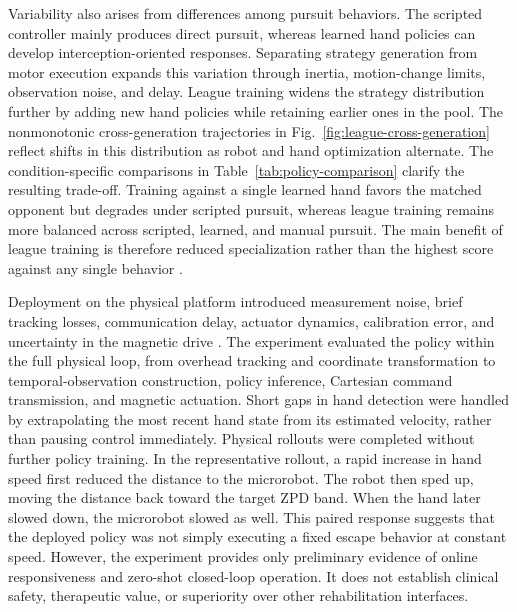 \documentclass[journal,twoside,web]{ieeecolor2}
\begin{document}
Variability also arises from differences among pursuit behaviors. The scripted controller mainly produces direct pursuit, whereas learned hand policies can develop interception-oriented responses. Separating strategy generation from motor execution expands this variation through inertia, motion-change limits, observation noise, and delay. League training widens the strategy distribution further by adding new hand policies while retaining earlier ones in the pool. The nonmonotonic cross-generation trajectories in Fig.~\ref{fig:league-cross-generation} reflect shifts in this distribution as robot and hand optimization alternate. The condition-specific comparisons in Table~\ref{tab:policy-comparison} clarify the resulting trade-off. Training against a single learned hand favors the matched opponent but degrades under scripted pursuit, whereas league training remains more balanced across scripted, learned, and manual pursuit. The main benefit of league training is therefore reduced specialization rather than the highest score against any single behavior \cite{lanctotUnifiedMARL2017,vinyalsAlphaStar2019,jaderbergPopulationGames2019,huangOpponentAwareLeague2023}.

Deployment on the physical platform introduced measurement noise, brief tracking losses, communication delay, actuator dynamics, calibration error, and uncertainty in the magnetic drive \cite{tobinDomainRandomization2017,pengDynamicsRandomization2018,muratoreRandomizedSimulations2022,chebotarClosingSimReal2019,tiboniDROPO2023}. The experiment evaluated the policy within the full physical loop, from overhead tracking and coordinate transformation to temporal-observation construction, policy inference, Cartesian command transmission, and magnetic actuation. Short gaps in hand detection were handled by extrapolating the most recent hand state from its estimated velocity, rather than pausing control immediately. Physical rollouts were completed without further policy training. In the representative rollout, a rapid increase in hand speed first reduced the distance to the microrobot. The robot then sped up, moving the distance back toward the target ZPD band. When the hand later slowed down, the microrobot slowed as well. This paired response suggests that the deployed policy was not simply executing a fixed escape behavior at constant speed. However, the experiment provides only preliminary evidence of online responsiveness and zero-shot closed-loop operation. It does not establish clinical safety, therapeutic value, or superiority over other rehabilitation interfaces.
\end{document}
